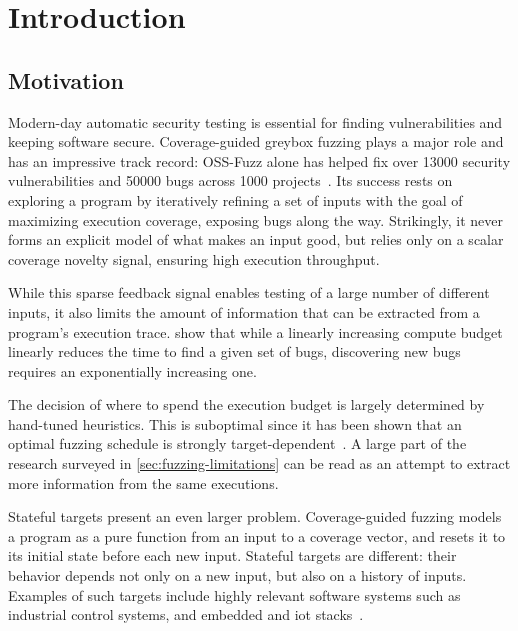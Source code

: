 
\chapter{Introduction}\label{chap:introduction}


\section{Motivation}\label{sec:introduction-motivation}

Modern-day automatic security testing is essential for finding vulnerabilities
and keeping software secure.
Coverage-guided greybox fuzzing plays a major role and has an impressive track
record: OSS-Fuzz alone has helped fix over \num{13000} security vulnerabilities
and \num{50000} bugs across \num{1000} projects~\cite{arya_oss-fuzz_nodate}.
Its success rests on exploring a program by iteratively refining a set of inputs
with the goal of maximizing execution coverage, exposing bugs along the way.
Strikingly, it never forms an explicit model of what makes an input good,
but relies only on a scalar coverage novelty signal, ensuring high execution
throughput.

While this sparse feedback signal enables testing of a large number of different inputs,
it also limits the amount of information that can be extracted from a program's execution trace.
\textcite{bohme_fuzzing_2020} show that while a linearly increasing compute budget
linearly reduces the time to find a given set of bugs, discovering
new bugs requires an exponentially increasing one.

The decision of where to spend the execution budget is largely determined by
hand-tuned heuristics.
This is suboptimal since it has been shown that an optimal fuzzing schedule
is strongly target-dependent~\cite{woo_scheduling_2013,bohme_coverage-based_2016}.
A large part of the research surveyed in \cref{sec:fuzzing-limitations} can be
read as an attempt to extract more information from the same executions.

Stateful targets present an even larger problem.
Coverage-guided fuzzing models a program as a pure function from an
input to a coverage vector, and resets it to its initial state before each new input.
Stateful targets are different: their behavior depends not only on a new input,
but also on a history of inputs.
Examples of such targets include highly relevant software systems such as
industrial control systems, and embedded and \gls{iot}
stacks~\cite{zhang_iot_2014,sadeghi_security_2015,borcherding_bandits_2023,ang_quic-fuzz_2025}.

